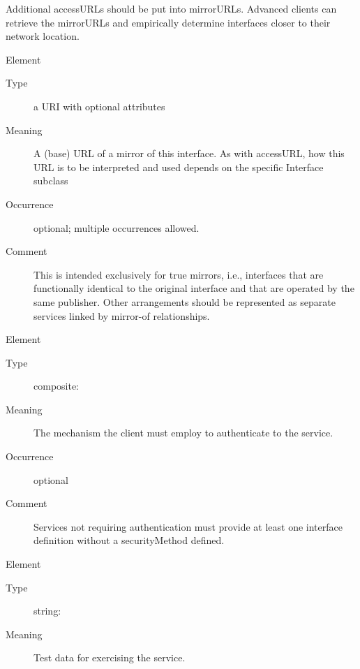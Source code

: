 \documentclass[11pt,a4paper]{ivoa}
\begin{document}
\begin{generated}
\begin{bigdescription}
\begin{description}
                 Additional accessURLs should be put into mirrorURLs.
                 Advanced clients can retrieve the mirrorURLs and 
                 empirically determine interfaces closer to their 
                 network location.
               

\end{description}
\item[Element \xmlel{mirrorURL}]
\begin{description}
\item[Type] a URI with optional attributes
\item[Meaning] 
                 A (base) URL of a mirror of this interface.  As with
                 accessURL, how this URL is to be interpreted and used 
                 depends on the specific Interface subclass
               
\item[Occurrence] optional; multiple occurrences allowed.
\item[Comment] 
                This is intended exclusively for true mirrors, i.e.,
                interfaces that are functionally identical to the
                original interface and that are operated by the same 
                publisher.  Other arrangements should be represented as
                separate services linked by mirror-of relationships.
               

\end{description}
\item[Element \xmlel{securityMethod}]
\begin{description}
\item[Type] composite: 
\item[Meaning] 
                  The mechanism the client must employ to authenticate
                  to the service.
               
\item[Occurrence] optional
\item[Comment] 
                  Services not requiring authentication must provide
                  at least one interface definition without a 
                  securityMethod defined.
               

\end{description}
\item[Element \xmlel{testQueryString}]
\begin{description}
\item[Type] string: 
\item[Meaning] 
                  Test data for exercising the service.
               

\end{description}
\end{bigdescription}
\end{generated}
\end{document}
